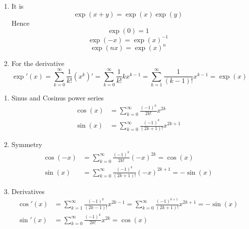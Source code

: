 \begin{lemma}\hfill
    \begin{enumerate}
        \item It is
              \[
                  \exp(x + y) = \exp(x)\exp(y)
              \]
              Hence
              \[
                  \exp(0) = 1
              \]
              \[
                  \exp(-x) = \exp(x)^{-1}
              \]
              \[
                  \exp(nx) = \exp(x)^n
              \]
        \item For the derivative
              \[
                  \exp'(x) = \sum_{k=0}^\infty \frac{1}{k!} (x^k)' = \sum_{k=0}^\infty \frac{1}{k!} kx^{k-1}
                  = \sum_{k=1}^\infty \frac{1}{(k-1)!} x^{k-1} = \exp(x)
              \]
    \end{enumerate}
\end{lemma}
\bigskip


\begin{lemma}\hfill
    \begin{enumerate}
        \item Sinus and Cosinus power series
              \[
                  \begin{split}
                      \cos(x) &= \sum_{k=0}^\infty \frac{(-1)^k}{2k!} x^{2k} \\
                      \sin(x) &= \sum_{k=0}^\infty \frac{(-1)^k}{(2k + 1)!} x^{2k + 1}
                  \end{split}
              \]
        \item Symmetry
              \[
                  \begin{split}
                      \cos(-x) &= \sum_{k=0}^\infty \frac{(-1)^k}{2k!} {(-x)}^{2k} = \cos(x) \\
                      \sin(x) &= \sum_{k=0}^\infty \frac{(-1)^k}{(2k + 1)!} {(-x)}^{2k + 1} = -\sin(x)
                  \end{split}
              \]
        \item Derivatives
              \[
                  \begin{split}
                      \cos'(x) &= \sum_{k=1}^\infty \frac{(-1)^k}{(2k - 1)!} x^{2k - 1}
                      = \sum_{k=0}^\infty \frac{(-1)^{k + 1}}{(2k + 1)!} x^{2k + 1} = -\sin(x) \\
                      \sin'(x) &= \sum_{k=0}^\infty \frac{(-1)^k}{2k!} {x}^{2k} = \cos(x)
                  \end{split}
              \]
    \end{enumerate}
\end{lemma}
\bigskip


